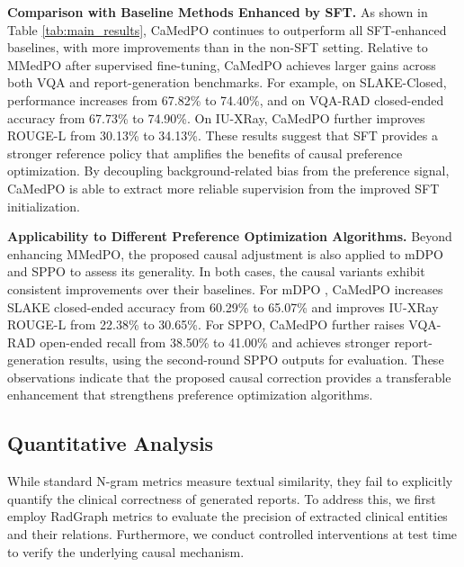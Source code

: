 \noindent\textbf{Comparison with Baseline Methods Enhanced by SFT.}
As shown in Table \ref{tab:main_results}, CaMedPO continues to outperform all SFT-enhanced baselines, with more improvements than in the non-SFT setting. Relative to MMedPO \cite{Zhu2025MMedPO} after supervised fine-tuning, CaMedPO achieves larger gains across both VQA and report-generation benchmarks. For example, on SLAKE-Closed, performance increases from 67.82\% to 74.40\%, and on VQA-RAD closed-ended accuracy from 67.73\% to 74.90\%. On IU-XRay, CaMedPO further improves ROUGE-L from 30.13\% to 34.13\%. These results suggest that SFT provides a stronger reference policy that amplifies the benefits of causal preference optimization. By decoupling background-related bias from the preference signal, CaMedPO is able to extract more reliable supervision from the improved SFT initialization.

\noindent\textbf{Applicability to Different Preference Optimization Algorithms.} Beyond enhancing MMedPO, the proposed causal adjustment is also applied to mDPO and SPPO to assess its generality. In both cases, the causal variants exhibit consistent improvements over their baselines. For mDPO \cite{wang2024mdpo}, CaMedPO increases SLAKE closed-ended accuracy from 60.29\% to 65.07\% and improves IU-XRay ROUGE-L from 22.38\% to 30.65\%. For SPPO, CaMedPO further raises VQA-RAD open-ended recall from 38.50\% to 41.00\% and achieves stronger report-generation results, using the second-round SPPO outputs for evaluation. These observations indicate that the proposed causal correction provides a transferable enhancement that strengthens preference optimization algorithms.

\subsection{Quantitative Analysis}
While standard N-gram metrics measure textual similarity, they fail to explicitly quantify the clinical correctness of generated reports. To address this, we first employ RadGraph metrics to evaluate the precision of extracted clinical entities and their relations. Furthermore, we conduct controlled interventions at test time to verify the underlying causal mechanism.

